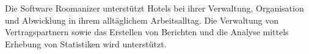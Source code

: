 \documentclass[../../Pflichtenheft.tex]{subfiles}
\begin{document}
    Die Software Roomanizer unterstützt Hotels bei ihrer Verwaltung, Organisation
    und Abwicklung in ihrem alltäglichem Arbeitsalltag. Die Verwaltung von Vertragspartnern
    sowie das Erstellen von Berichten und die Analyse mittels Erhebung von Statistiken wird
    unterstützt.
\end{document}
